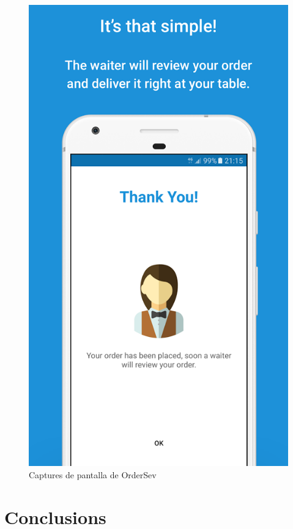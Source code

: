 \begin{figure}[H]
\includegraphics[scale=0.20]{Figures/fastorder-3.png}
\caption{Captures de pantalla de OrderSev}
\end{figure}


\section{Conclusions}

